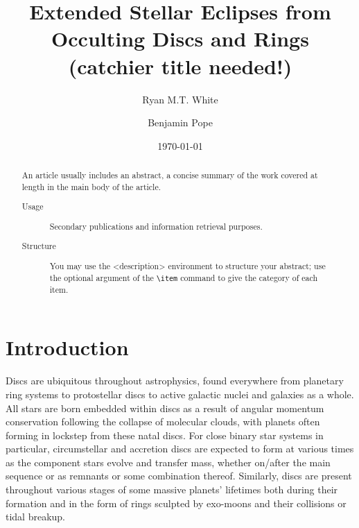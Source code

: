 \documentclass[%
 reprint,
 amsmath,amssymb,
 aps,
rmp,
floatfix,
]{revtex4-2}
\def\\{}%
\def\texttt#1{<#1>}%
\begin{document}

\title{Extended Stellar Eclipses from Occulting Discs and Rings (catchier title needed!)}%

\author{Ryan M.T. White}
%
\author{Benjamin Pope}%
%

\date{\today}%

\begin{abstract}
    An article usually includes an abstract, a concise summary of the work
    covered at length in the main body of the article. 
    \begin{description}
        \item[Usage]
        Secondary publications and information retrieval purposes.
        \item[Structure]
        You may use the \texttt{description} environment to structure your abstract;
        use the optional argument of the \verb+\item+ command to give the category of each item. 
    \end{description}
\end{abstract}

\maketitle


\section{Introduction} \label{sec:intro}
Discs are ubiquitous throughout astrophysics, found everywhere from planetary ring systems to protostellar discs to active galactic nuclei and galaxies as a whole. All stars are born embedded within discs as a result of angular momentum conservation following the collapse of molecular clouds, with planets often forming in lockstep from these natal discs. For close binary star systems in particular, circumstellar and accretion discs are expected to form at various times as the component stars evolve and transfer mass, whether on/after the main sequence or as remnants or some combination thereof. Similarly, discs are present throughout various stages of some massive planets' lifetimes both during their formation and in the form of rings sculpted by exo-moons and their collisions or tidal breakup.
\end{document}
